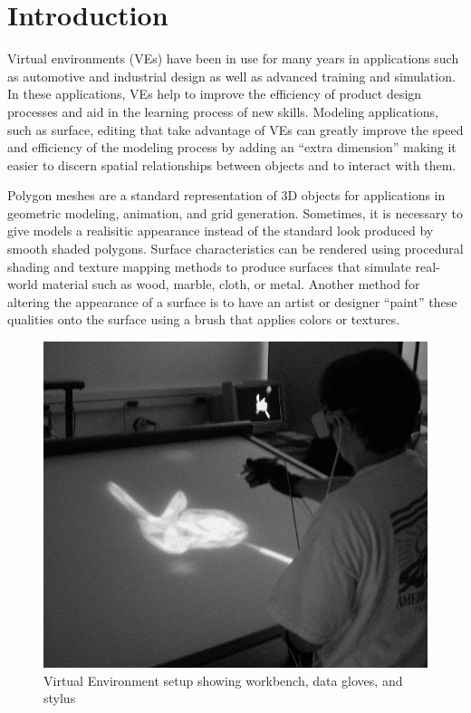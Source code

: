 \documentclass[10pt,twocolumn]{article}
\begin{document}
\section{Introduction}
\indent 
Virtual environments (VEs) have been in use for many years in applications
such as automotive and industrial design as well as advanced training and simulation.
In these applications, VEs help to improve the efficiency of product design processes
and aid in the learning process of new skills.
Modeling applications, such as surface, editing that take advantage of VEs 
can greatly improve the speed and efficiency of the
modeling process by adding an ``extra dimension'' 
making it easier to discern spatial relationships 
between objects and to interact with them.

Polygon meshes are a standard representation of 3D objects for applications
in geometric modeling, animation, and grid generation. 
Sometimes, it is necessary to give models
a realisitic appearance instead of the standard look produced by smooth shaded polygons.
Surface characteristics can be rendered using procedural shading and texture mapping methods 
to produce surfaces that simulate real-world material such as wood, marble, cloth, or metal.
Another method for altering the  appearance of a surface 
is to have an artist or designer ``paint''
these qualities onto the surface using a brush that applies colors or textures.

\begin{figure}
\begin{center}
\includegraphics[scale=0.5]{workbench.png}
\caption{Virtual Environment setup showing workbench, data gloves, and stylus}
\label{VESHardware}
\end{center}
\end{figure}
\end{document}
